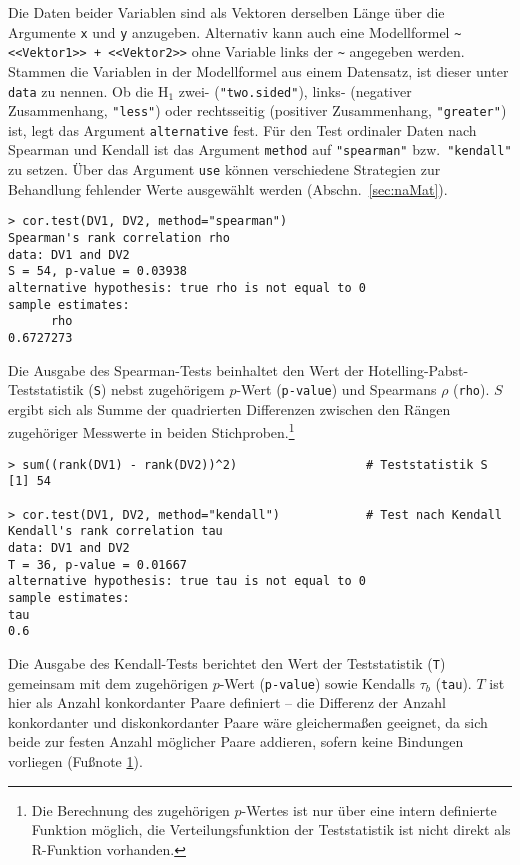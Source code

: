 Die Daten beider Variablen sind als Vektoren derselben Länge über die Argumente \lstinline!x! und \lstinline!y! anzugeben. Alternativ kann auch eine Modellformel \lstinline!~ <<Vektor1>> + <<Vektor2>>! ohne Variable links der \lstinline!~! angegeben werden. Stammen die Variablen in der Modellformel aus einem Datensatz, ist dieser unter \lstinline!data! zu nennen. Ob die $\text{H}_{1}$ zwei- (\lstinline!"two.sided"!), links- (negativer Zusammenhang, \lstinline!"less"!) oder rechtsseitig (positiver Zusammenhang, \lstinline!"greater"!) ist, legt das Argument \lstinline!alternative! fest. Für den Test ordinaler Daten nach Spearman und Kendall ist das Argument \lstinline!method! auf \lstinline!"spearman"! bzw.\ \lstinline!"kendall"! zu setzen. Über das Argument \lstinline!use! können verschiedene Strategien zur Behandlung fehlender Werte ausgewählt werden (Abschn.\ \ref{sec:naMat}).
\begin{lstlisting}
> cor.test(DV1, DV2, method="spearman")
Spearman's rank correlation rho
data: DV1 and DV2
S = 54, p-value = 0.03938
alternative hypothesis: true rho is not equal to 0
sample estimates:
      rho
0.6727273
\end{lstlisting}

Die Ausgabe des Spearman-Tests beinhaltet den Wert der Hotelling-Pabst-Teststatistik (\lstinline!S!) nebst zugehörigem $p$-Wert (\lstinline!p-value!) und Spearmans $\rho$ (\lstinline!rho!). $S$ ergibt sich als Summe der quadrierten Differenzen zwischen den Rängen zugehöriger Messwerte in beiden Stichproben.\footnote{\label{ftn:pKendall}Die Berechnung des zugehörigen $p$-Wertes ist nur über eine intern definierte Funktion möglich, die Verteilungsfunktion der Teststatistik ist nicht direkt als R-Funktion vorhanden.}
\begin{lstlisting}
> sum((rank(DV1) - rank(DV2))^2)                  # Teststatistik S
[1] 54

> cor.test(DV1, DV2, method="kendall")            # Test nach Kendall
Kendall's rank correlation tau
data: DV1 and DV2
T = 36, p-value = 0.01667
alternative hypothesis: true tau is not equal to 0
sample estimates:
tau
0.6
\end{lstlisting}

Die Ausgabe des Kendall-Tests berichtet den Wert der Teststatistik (\lstinline!T!) gemeinsam mit dem zugehörigen $p$-Wert (\lstinline!p-value!) sowie Kendalls $\tau_{b}$ (\lstinline!tau!). $T$ ist hier als Anzahl konkordanter Paare definiert -- die Differenz der Anzahl konkordanter und diskonkordanter Paare wäre gleichermaßen geeignet, da sich beide zur festen Anzahl möglicher Paare addieren, sofern keine Bindungen vorliegen (Fußnote \ref{ftn:pKendall}).

